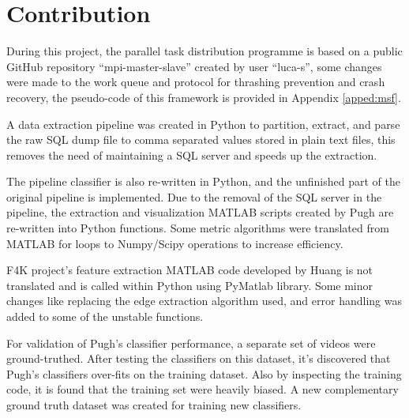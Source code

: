 \documentclass[bsc,logo,twoside,fullspacing,parskip]{infthesis}
\begin{document}


\section{Contribution}

During this project, the parallel task distribution programme is based on a public GitHub repository ``mpi-master-slave'' created by user ``luca-s''\cite{L5}, some changes were made to the work queue and protocol for thrashing prevention and crash recovery, the pseudo-code of this framework is provided in Appendix \ref{apped:msf}.

A data extraction pipeline was created in Python to partition, extract, and parse the raw SQL dump file to comma separated values stored in plain text files, this removes the need of maintaining a SQL server and speeds up the extraction. 

The pipeline classifier is also re-written in Python, and the unfinished part of the original pipeline is implemented. 
Due to the removal of the SQL server in the pipeline, the extraction and visualization MATLAB scripts created by Pugh are re-written into Python functions. 
Some metric algorithms were translated from MATLAB for loops to Numpy/Scipy operations to increase efficiency.

F4K project's feature extraction MATLAB code developed by Huang\cite{Huang} is not translated and is called within Python using PyMatlab library. Some minor changes like replacing the edge extraction algorithm used, and error handling was added to some of the unstable functions. 

For validation of Pugh's classifier performance, a separate set of videos were ground-truthed. After testing the classifiers on this dataset, it's discovered that Pugh's classifiers over-fits on the training dataset. Also by inspecting the training code, it is found that the training set were heavily biased. A new complementary ground truth dataset was created for training new classifiers. 
\end{document}
